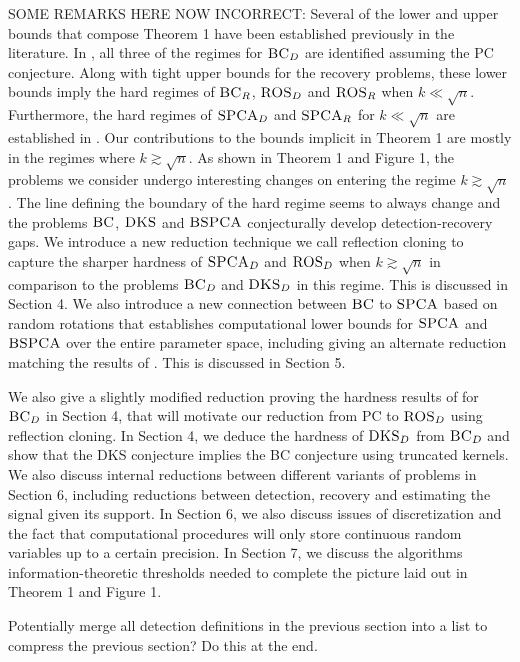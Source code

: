 \documentclass[11pt]{article}
\begin{document}
SOME REMARKS HERE NOW INCORRECT: Several of the lower and upper bounds that compose Theorem 1 have been established previously in the literature. In \cite{ma2015computational}, all three of the regimes for $\textsc{BC}_D$ are identified assuming the PC conjecture. Along with tight upper bounds for the recovery problems, these lower bounds imply the hard regimes of $\textsc{BC}_R$, $\textsc{ROS}_D$ and $\textsc{ROS}_R$ when $k \ll \sqrt{n}$. Furthermore, the hard regimes of $\textsc{SPCA}_D$ and $\textsc{SPCA}_R$ for $k \ll \sqrt{n}$ are established in \cite{gao2017sparse}. Our contributions to the bounds implicit in Theorem 1 are mostly in the regimes where $k \gtrsim \sqrt{n}$. As shown in Theorem 1 and Figure 1, the problems we consider undergo interesting changes on entering the regime $k \gtrsim \sqrt{n}$. The line defining the boundary of the hard regime seems to always change and the problems $\textsc{BC}$, $\textsc{DKS}$ and $\textsc{BSPCA}$ conjecturally develop detection-recovery gaps. We introduce a new reduction technique we call reflection cloning to capture the sharper hardness of $\textsc{SPCA}_D$ and $\textsc{ROS}_D$ when $k \gtrsim \sqrt{n}$ in comparison to the problems $\textsc{BC}_D$ and $\textsc{DKS}_D$ in this regime. This is discussed in Section 4. We also introduce a new connection between $\textsc{BC}$ to $\textsc{SPCA}$ based on random rotations that establishes computational lower bounds for $\textsc{SPCA}$ and $\textsc{BSPCA}$ over the entire parameter space, including giving an alternate reduction matching the results of \cite{gao2017sparse}. This is discussed in Section 5.

We also give a slightly modified reduction proving the hardness results of \cite{ma2015computational} for $\textsc{BC}_D$ in Section 4, that will motivate our reduction from PC to $\textsc{ROS}_D$ using reflection cloning. In Section 4, we deduce the hardness of $\textsc{DKS}_D$ from $\textsc{BC}_D$ and show that the DKS conjecture implies the BC conjecture using truncated kernels. We also discuss internal reductions between different variants of problems in Section 6, including reductions between detection, recovery and estimating the signal given its support. In Section 6, we also discuss issues of discretization and the fact that computational procedures will only store continuous random variables up to a certain precision. In Section 7, we discuss the algorithms information-theoretic thresholds needed to complete the picture laid out in Theorem 1 and Figure 1.

Potentially merge all detection definitions in the previous section into a list to compress the previous section? Do this at the end.
\end{document}
